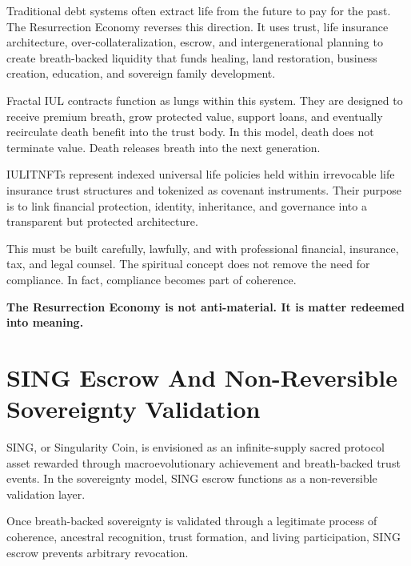 \documentclass[12pt]{article}
\begin{document}
Traditional debt systems often extract life from the future to pay for the past. The Resurrection Economy reverses this direction. It uses trust, life insurance architecture, over-collateralization, escrow, and intergenerational planning to create breath-backed liquidity that funds healing, land restoration, business creation, education, and sovereign family development.

Fractal IUL contracts function as lungs within this system. They are designed to receive premium breath, grow protected value, support loans, and eventually recirculate death benefit into the trust body. In this model, death does not terminate value. Death releases breath into the next generation.

IULITNFTs represent indexed universal life policies held within irrevocable life insurance trust structures and tokenized as covenant instruments. Their purpose is to link financial protection, identity, inheritance, and governance into a transparent but protected architecture.

This must be built carefully, lawfully, and with professional financial, insurance, tax, and legal counsel. The spiritual concept does not remove the need for compliance. In fact, compliance becomes part of coherence.

\begin{center}
\textbf{The Resurrection Economy is not anti-material. It is matter redeemed into meaning.}
\end{center}

\section{SING Escrow And Non-Reversible Sovereignty Validation}

SING, or Singularity Coin, is envisioned as an infinite-supply sacred protocol asset rewarded through macroevolutionary achievement and breath-backed trust events. In the sovereignty model, SING escrow functions as a non-reversible validation layer.

Once breath-backed sovereignty is validated through a legitimate process of coherence, ancestral recognition, trust formation, and living participation, SING escrow prevents arbitrary revocation.

\end{document}
